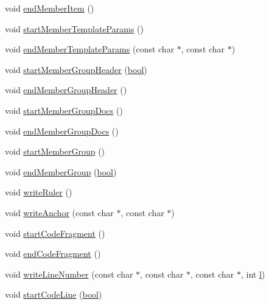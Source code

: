 \begin{DoxyCompactItemize}
\item 
void \hyperlink{class_man_generator_a0bf54b0520a592a870ae4d310c4890b2}{end\+Member\+Item} ()
\item 
void \hyperlink{class_man_generator_ad67219f83aa99539fc34e2142a734811}{start\+Member\+Template\+Params} ()
\item 
void \hyperlink{class_man_generator_a0fdb9af50bb49e0451dfbff090410358}{end\+Member\+Template\+Params} (const char $\ast$, const char $\ast$)
\item 
void \hyperlink{class_man_generator_ad61671374ab1bf2fe21d21b7589330c0}{start\+Member\+Group\+Header} (\hyperlink{qglobal_8h_a1062901a7428fdd9c7f180f5e01ea056}{bool})
\item 
void \hyperlink{class_man_generator_af4486862ca19909c0ae2489e0343673d}{end\+Member\+Group\+Header} ()
\item 
void \hyperlink{class_man_generator_a66ae1d09997555850f799cd41639939e}{start\+Member\+Group\+Docs} ()
\item 
void \hyperlink{class_man_generator_a60f94edabac05693a5c536c90ef45aaa}{end\+Member\+Group\+Docs} ()
\item 
void \hyperlink{class_man_generator_a5e1024895e01040f9f207aa96d838998}{start\+Member\+Group} ()
\item 
void \hyperlink{class_man_generator_a93050bd4f7fd8c3181a65b7967b167ea}{end\+Member\+Group} (\hyperlink{qglobal_8h_a1062901a7428fdd9c7f180f5e01ea056}{bool})
\item 
void \hyperlink{class_man_generator_ab7a5373b1e631879e56bf5699e00cfe2}{write\+Ruler} ()
\item 
void \hyperlink{class_man_generator_a196669b4dd3c70556bf585925ae824fe}{write\+Anchor} (const char $\ast$, const char $\ast$)
\item 
void \hyperlink{class_man_generator_a23377579a34bc5cee9a43885888dd5d4}{start\+Code\+Fragment} ()
\item 
void \hyperlink{class_man_generator_a4e825c27561ebb51c155840d9101725a}{end\+Code\+Fragment} ()
\item 
void \hyperlink{class_man_generator_a3fe4aad0243fbecd3b746448a9373d3c}{write\+Line\+Number} (const char $\ast$, const char $\ast$, const char $\ast$, int \hyperlink{060__command__switch_8tcl_aff56f84b49947b84b2a304f51cf8e678}{l})
\item 
void \hyperlink{class_man_generator_a2690c4b3d068da46f8a6804d43fd34e7}{start\+Code\+Line} (\hyperlink{qglobal_8h_a1062901a7428fdd9c7f180f5e01ea056}{bool})
\item 

\end{DoxyCompactItemize}

